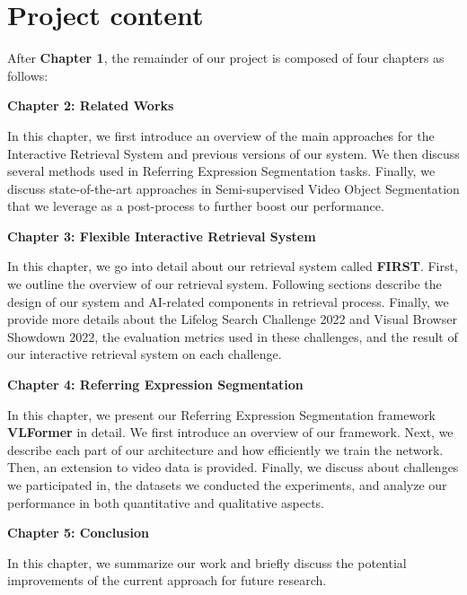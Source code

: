 \section{Project content}
\label{sec:thesis_content}

After \textbf{Chapter 1}, the remainder of our project is composed of four chapters as follows:


\textbf{Chapter 2: Related Works}

In this chapter, we first introduce an overview of the main approaches for the Interactive Retrieval System and previous versions of our system.
We then discuss several methods used in Referring Expression Segmentation tasks. Finally, we discuss state-of-the-art approaches in Semi-supervised Video Object Segmentation that we leverage as a post-process to further boost our performance.

\textbf{Chapter 3: Flexible Interactive Retrieval System}

In this chapter, we go into detail about our retrieval system called \textbf{FIRST}. First, we outline the overview of our retrieval system. Following sections describe the design of our system and AI-related components in retrieval process. Finally, we provide more details about the Lifelog Search Challenge 2022 and Visual Browser Showdown 2022, the evaluation metrics used in these challenges, and the result of our interactive retrieval system on each challenge.

\textbf{Chapter 4: Referring Expression Segmentation}

In this chapter, we present our Referring Expression Segmentation framework \textbf{VLFormer} in detail. We first introduce an overview of our framework. Next, we describe each part of our architecture and how efficiently we train the network. Then, an extension to video data is provided. Finally, we discuss about challenges we participated in, the datasets we conducted the experiments, and analyze our performance in both quantitative and qualitative aspects. 

\textbf{Chapter 5: Conclusion}

In this chapter, we summarize our work and briefly discuss the potential improvements of the current approach for future research.